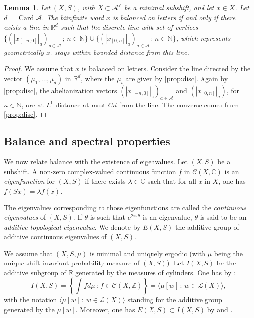 \documentclass{article}
\newtheorem{lemma}{Lemma}%
\theoremstyle{definition}
\newcommand{\N}{\mathbb{N}}
\newcommand{\C}{\mathcal{C}}
\DeclareMathOperator{\Card}{Card}
\begin{document}
 \begin{lemma}\label{lem:dist}
 Let $(X,S)$, with $X \subset {\mathcal A}^{\mathbb Z}$ be a minimal subshift, and let $x \in X$. Let $d=\Card {\mathcal A}$.
 The  biinfinite word $x$ is  balanced  on letters if and only if there exists  a line in $\mathbb R^d$ such that   the discrete line with  set of  vertices
 $\{(|x_{[-n,0]}|_a)_{a \in \mathcal A} \,;\,  n \in \N\} \cup  \{( |x_{[0,n]}|_a)_{a \in \mathcal A}  \,;\,  n \in \N\} $, which represents geometrically  $x$, stays  within   bounded distance from this line.
 \end{lemma}
 \begin{proof}
We assume that $x$ is  balanced  on letters. Consider the line  directed by  the  vector $(\mu_1,\ldots, \mu_d)$ in  $\mathbb R^d$, where the $\mu_i$ are given by \cref{prop:disc}. Again by \cref{prop:disc},  the abelianization vectors   $(|x_{[-n,0]}|_a)_{a \in \mathcal A}$ and  $(|x_{[0,n]} |_a)$, for $n \in {\mathbb N}$, are at $L^1$ distance at most $Cd$  from the  line.
The converse comes from  \cref{prop:disc}.
 \end{proof}


\subsection{Balance and spectral properties}\label{subsec:eigen}
We now relate  balance   with the existence  of  eigenvalues.
 Let $(X,S)$ be a  subshift.
A non-zero complex-valued continuous function $f$ in ${\mathcal C}(X,\mathbb{C})$
is an {\em eigenfunction} for $(X,S)$ if there exists
$\lambda \in  {\mathbb C} $ such that
for all $x$ in $X$,  one has $f(Sx)=\lambda f(x).$ 

The  eigenvalues corresponding to those eigenfunctions
are called the {\em continuous
eigenvalues} of $(X,S)$. If $\theta $ is such that $e^{2i \pi \theta}$ is an   eigenvalue, 
$\theta$ is said to be an {\em additive topological   eigenvalue}.  We  denote by  $E(X,S)$  the  additive  group of additive continuous eigenvalues of $(X,S)$.

We assume that $(X,S,\mu)$ is minimal and uniquely ergodic  (with $\mu$ being the unique shift-invariant  probability measure of $(X,S)$).
  Let  $I(X,S)$ be  the  additive subgroup  of ${\mathbb R}$ generated by   the measures of  cylinders. One has   by  \cite[Proposition 2.3]{BCDLPP:19}:
$$I(X,S) = \left\{ \int f d\mu \,: \, f \in \C(X,{\mathbb Z})\right\}=  \langle\mu[w]  \,: \,   w\in\mathcal{L}(X)\rangle,$$ 
with the notation $\langle\mu[w]  \,: \,   w\in\mathcal{L}(X)\rangle$ standing for the additive  group generated by the $\mu[w]$.
Moreover, one has  $E(X,S) \subset I(X,S)$ by   \cite[Proposition 11]{CortDP:16} and   \cite[Corollary 3.7]{GHH:18}. 
 
\end{document}
